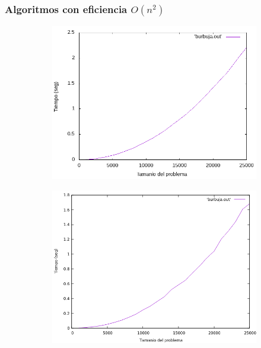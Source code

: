 \documentclass[12pt,spanish]{article}
\begin{document}
\subsubsection{Algoritmos con eficiencia $O(n^2)$}
\begin{figure}[H]
\centering
\begin{subfigure}[b]{0.45\textwidth}
\includegraphics[scale=0.45]{empirica_burbuja.png}
\caption{}
\end{subfigure}
\quad
\begin{subfigure}[b]{0.45\textwidth}
\includegraphics[scale=0.45]{empirica_burbuja_2.png}
\caption{}
\end{subfigure}
\newline

\end{figure}
\end{document}
